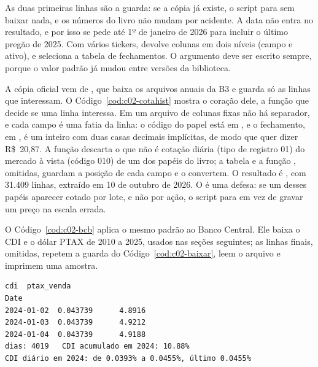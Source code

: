 

As duas primeiras linhas são a guarda: se a cópia já existe, o script para sem baixar nada, e os números do livro não mudam por acidente. A data  não entra no resultado, e por isso se pede até 1º de janeiro de 2026 para incluir o último pregão de 2025. Com vários tickers,  devolve colunas em dois níveis (campo e ativo), e  seleciona a tabela de fechamentos. O argumento  deve ser escrito sempre, porque o valor padrão já mudou entre versões da biblioteca.

A cópia oficial vem de , que baixa os arquivos anuais da B3 e guarda só as linhas que interessam. O Código~\ref{cod:c02-cotahist} mostra o coração dele, a função que decide se uma linha interessa. Em um arquivo de colunas fixas não há separador, e cada campo é uma fatia da linha: o código do papel está em , e o fechamento, em , é um inteiro com duas casas decimais implícitas, de modo que  quer dizer R\$~20,87. A função descarta o que não é cotação diária (tipo de registro 01) do mercado à vista (código 010) de um dos papéis do livro; a tabela  e a função , omitidas, guardam a posição de cada campo e o convertem. O resultado é , com 31.409 linhas, extraído em 10 de outubro de 2026. O  é uma defesa: se um desses papéis aparecer cotado por lote, e não por ação, o script para em vez de gravar um preço na escala errada.



O Código~\ref{cod:c02-bcb} aplica o mesmo padrão ao Banco Central. Ele baixa o CDI e o dólar PTAX de 2010 a 2025, usados nas seções seguintes; as linhas finais, omitidas, repetem a guarda do Código~\ref{cod:c02-baixar}, leem o arquivo e imprimem uma amostra.


\begin{lstlisting}[style=saida]
                 cdi  ptax_venda
Date
2024-01-02  0.043739      4.8916
2024-01-03  0.043739      4.9212
2024-01-04  0.043739      4.9188
dias: 4019   CDI acumulado em 2024: 10.88%
CDI diário em 2024: de 0.0393% a 0.0455%, último 0.0455%
\end{lstlisting}

